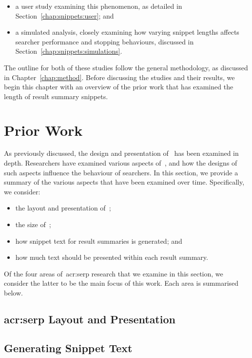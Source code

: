 \begin{itemize}
    \item{a user study examining this phenomenon, as detailed in Section~\ref{chap:snippets:user}; and}
    \item{a simulated analysis, closely examining how varying snippet lengths affects searcher performance and stopping behaviours, discussed in Section~\ref{chap:snippets:simulations}.}
\end{itemize}

The outline for both of these studies follow the general methodology, as discussed in Chapter~\ref{chap:method}. Before discussing the studies and their results, we begin this chapter with an overview of the prior work that has examined the length of result summary snippets.

\section{Prior Work}\label{chap:snippets:background}
As previously discussed, the design and presentation of~ has been examined in depth. Researchers have examined various aspects of~, and how the designs of such aspects influence the behaviour of searchers. In this section, we provide a summary of the various aspects that have been examined over time. Specifically, we consider:

\begin{itemize}
    \item{the layout and presentation of~;}
    \item{the size of~;}
    \item{how snippet text for result summaries is generated; and}
    \item{how much text should be presented within each result summary}.
\end{itemize}

Of the four areas of~\gls{acr:serp} research that we examine in this section, we consider the latter to be the main focus of this work. Each area is summarised below.

\subsection{\gls{acr:serp} Layout and Presentation}

\subsection{Generating Snippet Text}

